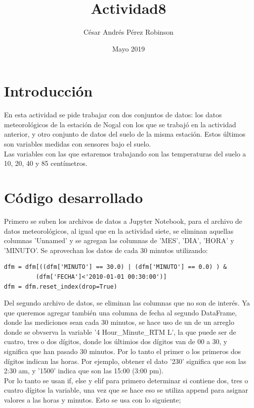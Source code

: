 \documentclass[11pt, spanish]{report}
\title{Actividad8}
\author{César Andrés Pérez Robinson }
\date{Mayo 2019}
\begin{document}
\maketitle

\section{Introducción}
En esta actividad se pide trabajar con dos conjuntos de datos: los datos meteorológicos de la estación de Nogal con los que se trabajó en la actividad anterior, y otro conjunto de datos del suelo de la misma estación. Estos últimos son variables medidas con sensores bajo el suelo. \\ Las variables con las que estaremos trabajando son las temperaturas del suelo a 10, 20, 40 y 85 centímetros.
\section{Código desarrollado}
Primero se suben los archivos de datos a Jupyter Notebook, para el archivo de datos meteorológicos, al igual que en la actividad siete, se eliminan aquellas columnas 'Unnamed' y se agregan las columnas de 'MES', 'DIA', 'HORA' y 'MINUTO'. Se aprovechan los datos de cada 30 minutos utilizando:
\begin{verbatim}
dfm = dfm[((dfm['MINUTO'] == 30.0) | (dfm['MINUTO'] == 0.0) ) & 
         (dfm['FECHA']<'2010-01-01 00:30:00')]
dfm = dfm.reset_index(drop=True)
\end{verbatim}
Del segundo archivo de datos, se eliminan las columnas que no son de interés. Ya que queremos agregar también una columna de fecha al segundo DataFrame, donde las mediciones sean cada 30 minutos, se hace uso de un de un arreglo donde se obvserva la variable '4 Hour\_Minute\_RTM  L', la que puede ser de cuatro, tres o dos dígitos, donde los últimios dos dígitos van de 00 a 30, y significa que han pasado 30 minutos. Por lo tanto el primer o los primeros dos dígitos indican las horas. Por ejemplo, obtener el dato '230' significa que son las 2:30 am, y '1500' indica que son las 15:00 (3:00 pm). \\
Por lo tanto se usan if, else y elif para primero determinar si contiene dos, tres o cuatro dígitos la variable, una vez que se hace eso se utiliza append para asignar valores a las horas y minutos. Esto se usa con lo siguiente;
\end{document}
